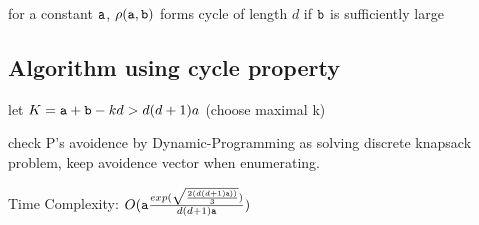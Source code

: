 \begin{corollary}
for a constant $\mathtt{a}$, $\rho(\mathtt{a},\mathtt{b})$ forms cycle of length $d$ if $\mathtt{b}$ is sufficiently large
\end{corollary}

\subsection{Algorithm using cycle property}

let $K=\mathtt{a}+\mathtt{b}-kd>d(d+1)a$ (choose maximal k)

\begin{algorithmic}
     
    \ENDIF
  \ENDFOR
\end{algorithmic}
check P's avoidence by Dynamic-Programming as solving discrete knapsack problem, keep avoidence vector when enumerating.

Time Complexity: $O(\mathtt{a}\frac{exp(\sqrt{\frac{2(d(d+1)\mathtt{a}))}{3} } )}{d(d+1)\mathtt{a}})$
